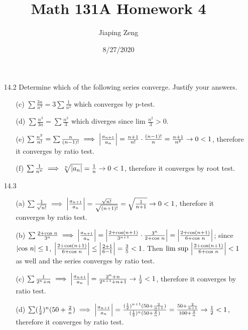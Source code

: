\documentclass{article}
\title{Math 131A Homework 4}
\date{8/27/2020}
\author{Jiaping Zeng}
\begin{document}
\maketitle

\begin{itemize}
    \item [14.2] Determine which of the following series converge. Justify your answers.
          \begin{itemize}
              \item [(c)] $\sum\frac{3n}{n^3}=3\sum\frac{1}{n^2}$ which converges by p-test.
              \item [(d)] $\sum\frac{n^3}{3n}=\sum\frac{n^2}{3}$ which diverges since $\text{lim }\frac{n^2}{3}>0$.
              \item [(e)] $\sum\frac{n^2}{n!}=\sum\frac{n}{(n-1)!}\implies\abs{\frac{a_{n+1}}{a_n}}=\frac{n+1}{n!}\cdot\frac{(n-1)!}{n}=\frac{n+1}{n^2}\rightarrow 0<1$, therefore it converges by ratio test.
              \item [(f)] $\sum\frac{1}{n^n}\implies\sqrt[n]{\abs{a_n}}=\frac{1}{n}\rightarrow 0<1$, therefore it converges by root test.
          \end{itemize}
    \item [14.3]
          \begin{itemize}
              \item [(a)] $\sum\frac{1}{\sqrt{n!}}\implies\abs{\frac{a_{n+1}}{a_n}}=\frac{\sqrt{n!}}{\sqrt{(n+1)!}}=\sqrt{\frac{1}{n+1}}\rightarrow 0<1$, therefore it converges by ratio test.
              \item [(b)] $\sum\frac{2+\text{cos }n}{3^n}\implies\abs{\frac{a_{n+1}}{a_n}}=\abs{\frac{2+\text{cos}(n+1)}{3^{n+1}}\cdot\frac{3^n}{2+\text{cos }n}}=\abs{\frac{2+\text{cos}(n+1)}{6+\text{cos }n}}$; since $\abs{\text{cos }n}\leq 1$, $\abs{\frac{2+\text{cos}(n+1)}{6+\text{cos }n}}\leq\abs{\frac{2+1}{6-1}}=\frac{3}{5}<1$. Then $\text{lim sup }\abs{\frac{2+\text{cos}(n+1)}{6+\text{cos }n}}<1$ as well and the series converges by ratio test.
              \item [(c)] $\sum\frac{1}{2^n+n}\implies\abs{\frac{a_{n+1}}{a_n}}=\frac{2^n+n}{2^{n+1}+n+1}\rightarrow\frac{1}{2}<1$, therefore it converges by ratio test.
              \item [(d)] $\sum(\frac{1}{2})^n(50+\frac{2}{n})\implies\abs{\frac{a_{n+1}}{a_n}}=\frac{(\frac{1}{2})^{n+1}(50+\frac{2}{n+1})}{(\frac{1}{2})^n(50+\frac{2}{n})}=\frac{50+\frac{2}{n+1}}{100+\frac{4}{n}}\rightarrow\frac{1}{2}<1$, therefore it converges by ratio test.

\end{itemize}
\end{itemize}
\end{document}
